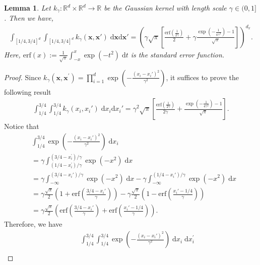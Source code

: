 \documentclass[11pt]{article}
\newcommand{\bx}{\mathbf x}
\newcommand{\R}{\mathbb{R}}
\newcommand{\0}{\mathbf{0}}
\newtheorem{lem}{Lemma}[section]
\begin{document}
\begin{appendix}
\begin{lem}\label{lem:gaussian_kernel_embedding}
    Let $k_{\gamma} : \R^{d}\times \R^{d}\to\R$ be the Gaussian kernel with length scale $\gamma\in (0,1]$. Then we have,
    \begin{align*}
        \int_{[1/4,3/4]^{d}}\int_{[1/4,3/4]^{d}} k_{\gamma}(\bx, \bx') \;\mathrm{d}\bx \mathrm{d} \bx' = \left(\gamma \sqrt{\pi} \left[\frac{\mathrm{erf}\left(\frac{1}{2\gamma}\right)}{2} + \gamma\frac{\exp\left(-\frac{1}{4\gamma^2}\right)-1}{\sqrt{\pi}}\right]\right)^{d_x}.
    \end{align*}
    Here, $\mathrm{erf}(x) := \frac{1}{\sqrt{\pi}}\int^{x}_{-x}\exp\left(-t^2\right)\;\mathrm{d}t$ is the standard error function.
\end{lem}
\begin{proof}
    Since $k_{\gamma}(\bx, \bx^\prime) = \prod_{i=1}^{d} \exp\left(-\frac{(x_i - x_i')^2}{\gamma^2}\right)$, it suffices to prove the following result
    \begin{align*}
        \int_{1/4}^{3/4} \int_{1/4}^{3/4} k_{\gamma}(x_i, x_i') \;\mathrm{d} x_i \mathrm{d} x_i' =  \gamma^2 \sqrt{\pi} \left[\frac{\mathrm{erf}\left(\frac{1}{2\gamma}\right)}{2\gamma} + \frac{\exp\left(-\frac{1}{4\gamma^2}\right)-1}{\sqrt{\pi}}\right].
    \end{align*}
    Notice that 
    \begin{align*}
        &\int_{1/4}^{3/4} \exp \left(-\frac{(x_i - x_i')^2}{\gamma^2} \right) \;\mathrm{d} x_i\\ &= \gamma \int_{(1/4-x_i^\prime) / \gamma}^{(3/4-x_i^\prime) / \gamma}  \exp(-x^2) \;\mathrm{d}x \\
        &=\gamma \int^{(3/4-x_i')/\gamma}_{-\infty}\exp(-x^2) \;\mathrm{d}x - \gamma \int^{(1/4-x_i')/\gamma}_{-\infty}\exp(-x^2)\;\mathrm{d}x\\
        &=\gamma\frac{\sqrt{\pi}}{2}\left(1+\mathrm{erf}\left(\frac{3/4-x_i'}{\gamma}\right)\right) - \gamma\frac{\sqrt{\pi}}{2}\left(1-\mathrm{erf}\left(\frac{x_i'-1/4}{\gamma}\right)\right)\\
        &=\gamma\frac{\sqrt{\pi}}{2}\left(\mathrm{erf}\left(\frac{3/4-x_i'}{\gamma}\right) + \mathrm{erf}\left(\frac{x_i'-1/4}{\gamma}\right)\right).
    \end{align*}
    Therefore, we have
    \begin{align*}
        &\quad \int_{1/4}^{3/4} \int_{1/4}^{3/4} \exp \left(-\frac{(x_i - x_i')^2}{\gamma^2} \right) \;\mathrm{d} x_i \;\mathrm{d} x_i^\prime \\

\end{align*}
\end{proof}
\end{appendix}
\end{document}
